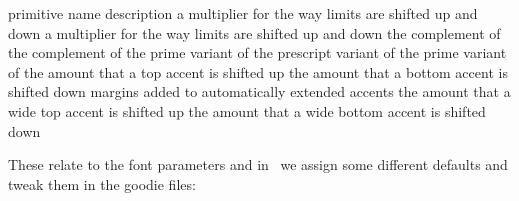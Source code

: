 \starttabulate
\FL
\BC primitive name                             \BC description \NC \NR
\TL
\NC \type {\Umathconnectoroverlapmin}            \NC \NC \NR
\NC \type {\Umathsubsupshiftdown}                \NC \NC \NR
\NC \type {\Umathfractiondelsize}                \NC \NC \NR
\NC \type {\Umathnolimitsupfactor}               \NC a multiplier for the way limits are shifted up and down \NC \NR
\NC \type {\Umathnolimitsubfactor}               \NC a multiplier for the way limits are shifted up and down \NC \NR
\NC \type {\Umathaccentbasedepth}                \NC the complement of \type {\Umathaccentbaseheight} \NC \NR
\NC \type {\Umathflattenedaccentbasedepth}       \NC the complement of \type {\Umathflattenedaccentbaseheight} \NC \NR
\NC \type {\Umathspacebeforescript}              \NC \NC \NR
\NC \type {\Umathprimeraise}                     \NC \NC \NR
\NC \type {\Umathprimeraisecomposed}             \NC \NC \NR
\NC \type {\Umathprimeshiftup}                   \NC the prime variant of \type {\Umathsupshiftup} \NC \NR
\NC \type {\Umathprimespaceafter}                \NC the prescript variant of \type {\Umathspaceafterscript} \NC \NR
\NC \type {\Umathprimeshiftdrop}                 \NC the prime variant of \type {\Umathsupshiftdrop} \NC \NR
\NC \type {\Umathskeweddelimitertolerance}       \NC \NC \NR
\NC \type {\Umathaccenttopshiftup}               \NC the amount that a top accent is shifted up \NC \NR
\NC \type {\Umathaccentbottomshiftdown}          \NC the amount that a bottom accent is shifted down \NC \NR
\NC \type {\Umathaccenttopovershoot}             \NC \NC \NR
\NC \type {\Umathaccentbottomovershoot}          \NC \NC \NR
\NC \type {\Umathaccentsuperscriptdrop}          \NC \NC \NR
\NC \type {\Umathaccentsuperscriptpercent}       \NC \NC \NR
\NC \type {\Umathaccentextendmargin}             \NC margins added to automatically extended accents \NC \NR
\NC \type {\Umathflattenedaccenttopshiftup}      \NC the amount that a wide top accent is shifted up \NC \NR
\NC \type {\Umathflattenedaccentbottomshiftdown} \NC the amount that a wide bottom accent is shifted down \NC \NR
\NC \type {\Umathdelimiterpercent}               \NC \NC \NR
\NC \type {\Umathdelimitershortfall}             \NC \NC \NR
\NC \type {\Umathradicalextensiblebefore}        \NC \NC \NR
\NC \type {\Umathradicalextensibleafter}         \NC \NC \NR
\LL
\stoptabulate

These relate to the font parameters and in \CONTEXT\ we assign some different
defaults and tweak them in the goodie files:

